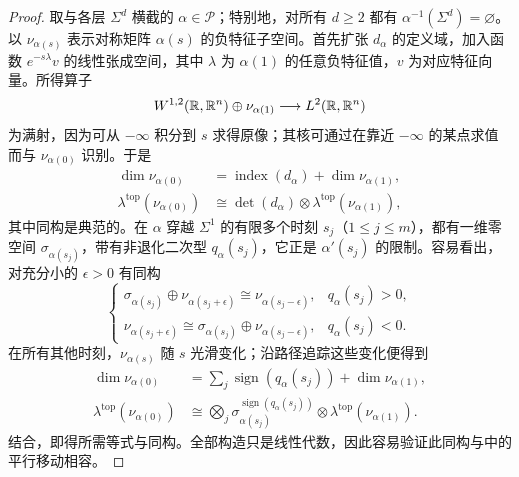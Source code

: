 \begin{proof}
取与各层 $\Sigma^d$ 横截的 $\alpha\in\mathcal P$；特别地，对所有 $d\geq2$ 都有 $\alpha^{-1}(\Sigma^d)=\varnothing$。以 $\nu_{\alpha(s)}$ 表示对称矩阵 $\alpha(s)$ 的负特征子空间。首先扩张 $d_\alpha$ 的定义域，加入函数
$e^{-s\lambda}v$ 的线性张成空间，其中 $\lambda$ 为 $\alpha(1)$ 的任意负特征值，$v$ 为对应特征向量。所得算子
\[
W^{1,2}(\mathbb R,\mathbb R^n)\oplus\nu_{\alpha(1)}\longrightarrow L^2(\mathbb R,\mathbb R^n)
\]
为满射，因为可从 $-\infty$ 积分到 $s$ 求得原像；其核可通过在靠近 $-\infty$ 的某点求值而与 $\nu_{\alpha(0)}$ 识别。于是
\begin{equation}\label{eq:11.7}
\begin{aligned}
\dim\nu_{\alpha(0)}&=\operatorname{index}(d_\alpha)+\dim\nu_{\alpha(1)},\\
\lambda^{\mathrm{top}}(\nu_{\alpha(0)})&\cong\det(d_\alpha)\otimes\lambda^{\mathrm{top}}(\nu_{\alpha(1)}),
\end{aligned}
\end{equation}
其中同构是典范的。在 $\alpha$ 穿越 $\Sigma^1$ 的有限多个时刻 $s_j$（$1\leq j\leq m$），都有一维零空间 $\sigma_{\alpha(s_j)}$，带有非退化二次型 $q_\alpha(s_j)$，它正是 $\alpha'(s_j)$ 的限制。容易看出，对充分小的 $\epsilon>0$ 有同构
\[
\begin{cases}
\sigma_{\alpha(s_j)}\oplus\nu_{\alpha(s_j+\epsilon)}\cong\nu_{\alpha(s_j-\epsilon)},&q_\alpha(s_j)>0,\\
\nu_{\alpha(s_j+\epsilon)}\cong\sigma_{\alpha(s_j)}\oplus\nu_{\alpha(s_j-\epsilon)},&q_\alpha(s_j)<0.
\end{cases}
\]
在所有其他时刻，$\nu_{\alpha(s)}$ 随 $s$ 光滑变化；沿路径追踪这些变化便得到
\[
\begin{aligned}
\dim\nu_{\alpha(0)}&=\sum_j\operatorname{sign}(q_\alpha(s_j))+\dim\nu_{\alpha(1)},\\
\lambda^{\mathrm{top}}(\nu_{\alpha(0)})&\cong\bigotimes_j\sigma_{\alpha(s_j)}^{\operatorname{sign}(q_\alpha(s_j))}
\otimes\lambda^{\mathrm{top}}(\nu_{\alpha(1)}).
\end{aligned}
\]
结合，即得所需等式与同构。全部构造只是线性代数，因此容易验证此同构与中的平行移动相容。
\end{proof}

